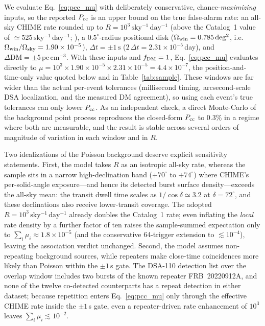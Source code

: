 We evaluate Eq.~\eqref{eq:pcc_mu} with deliberately conservative,
chance-\emph{maximizing} inputs, so the reported $P_{\rm cc}$ is an upper bound on
the true false-alarm rate: an all-sky CHIME rate rounded up to
$R = 10^{3}\,\mathrm{sky^{-1}\,day^{-1}}$ (above the Catalog~1 value of
$\simeq525\,\mathrm{sky^{-1}\,day^{-1}}$; \citealt{CHIME2021Catalog}), a
$0.5^{\circ}$-radius positional disk ($\Omega_{\rm win}=0.785\,\mathrm{deg^2}$,
i.e.\ $\Omega_{\rm win}/\Omega_{\rm sky}=1.90\times10^{-5}$),
$\Delta t = \pm1\,\mathrm{s}$ ($2\,\Delta t = 2.31\times10^{-5}$\,day), and
$\Delta\mathrm{DM}=\pm5\,\mathrm{pc\,cm^{-3}}$. With these inputs and
$f_{\rm DM}=1$, Eq.~\eqref{eq:pcc_mu} evaluates directly to
$\mu = 10^{3}\times1.90\times10^{-5}\times2.31\times10^{-5}
= 4.4\times10^{-7}$, the position-and-time-only value quoted below and in
Table~\ref{tab:sample}.
These windows are far wider than the actual per-event tolerances (millisecond
timing, arcsecond-scale DSA localization, and the measured DM agreement), so using
each event's true tolerances can only lower $P_{\rm cc}$. As an independent check,
a direct Monte-Carlo of the background point process reproduces the closed-form
$P_{\rm cc}$ to $0.3\%$ in a regime where both are measurable, and the result is
stable across several orders of magnitude of variation in each window and in $R$.

Two idealizations of the Poisson background deserve explicit sensitivity
statements. First, the model takes $R$ as an isotropic all-sky rate, whereas
the sample sits in a narrow high-declination band ($+70^{\circ}$ to
$+74^{\circ}$) where CHIME's per-solid-angle exposure---and hence its detected
burst surface density---exceeds the all-sky mean: the transit dwell time
scales as $1/\cos\delta\simeq3.2$ at $\delta=72^{\circ}$, and these
declinations also receive lower-transit coverage. The adopted
$R=10^{3}\,\mathrm{sky^{-1}\,day^{-1}}$ already doubles the Catalog~1 rate;
even inflating the \emph{local} rate density by a further factor of ten
raises the sample-summed expectation only to
$\sum_i\mu_i\approx1.8\times10^{-5}$ (and the conservative 64-trigger
extension to $\lesssim10^{-4}$), leaving the association verdict unchanged.
Second, the model assumes non-repeating background sources, while repeaters
make close-time coincidences more likely than Poisson within the $\pm1$\,s
gate. The DSA-110 detection list over the overlap window includes two bursts
of the known repeater FRB~20220912A, and none of the twelve co-detected
counterparts has a repeat detection in either dataset; because repetition
enters Eq.~\eqref{eq:pcc_mu} only through the effective CHIME rate inside the
$\pm1$\,s gate, even a repeater-driven rate enhancement of $10^{3}$ leaves
$\sum_i\mu_i\lesssim10^{-2}$.


